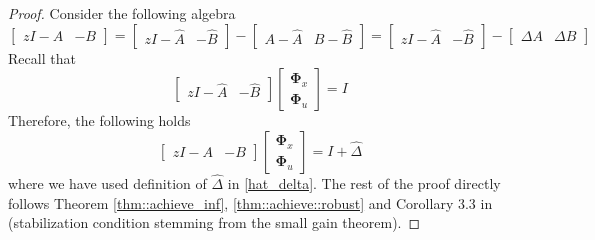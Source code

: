 \documentclass{article}[12pt]
\begin{document}
\begin{proof}
Consider the following algebra
\begin{equation}
    \left[\begin{array}{ll}{z I-A} & {-B}\end{array}\right] = \left[\begin{array}{ll}{z I-\hat{A}} & {-\hat{B}}\end{array}\right] - \left[\begin{array}{ll}{A-\hat{A}} & {B-\hat{B}}\end{array}\right] = \left[\begin{array}{ll}{z I-\hat{A}} & {-\hat{B}}\end{array}\right] - \left[\begin{array}{ll}{\Delta A} & {\Delta B}\end{array}\right]
\end{equation}
Recall that 
\begin{equation}
    \left[\begin{array}{ll}{z I-\widehat{A}} & {-\widehat{B}}\end{array}\right]\left[\begin{array}{l}{\mathbf{\Phi}_{x}} \\ {\mathbf{\Phi}_{u}}\end{array}\right]=I
\end{equation}
Therefore, the following holds
\begin{equation}
    \left[\begin{array}{ll}{z I-A} & {-B}\end{array}\right]\left[\begin{array}{l}{\mathbf{\Phi}_{x}} \\ {\mathbf{\Phi}_{u}}\end{array}\right]=I+\hat{\Delta}
\end{equation}
where we have used definition of $\hat{\Delta}$ in \eqref{hat_delta}. The rest of the proof directly follows Theorem \ref{thm::achieve_inf}, \ref{thm::achieve::robust} and Corollary 3.3 in \cite{dean2017sample} (stabilization condition stemming from the small gain theorem).
\end{proof}
\end{document}
